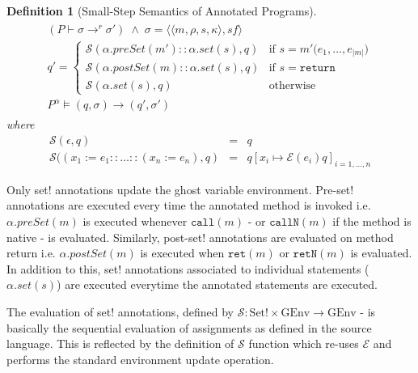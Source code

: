 \documentclass[10pt,notitlepage,twoside]{article}
\newcommand{\eframe}[4]{\langle #1, #2, #3, #4 \rangle}
\newcommand{\state}[2]{\langle #1, #2 \rangle}
\newcommand{\cf}{\mathit{sf}}
\newtheorem{definition}{Definition}
\begin{document}
\begin{definition}[Small-Step Semantics of Annotated Programs]
\begin{displaymath}
\begin{array}{l}
\begin{array}{c}
(P \vdash \sigma \rightarrow^r \sigma')\;\wedge\; \sigma = \state{\eframe{m}{\rho}{s}{\kappa}}{\cf}   \\
q' = \left \{ \begin{array}{ll}
\mathcal{S}(\alpha.\mathit{preSet}(m')::\alpha.\mathit{set}(s),q) & \mbox{if } s = m'\texttt{(}e_1,\ldots,e_{|m|}\texttt{)} \\
\mathcal{S}(\alpha.\mathit{postSet}(m)::\alpha.\mathit{set}(s),q) & \mbox{if } s= \texttt{return}   \\
\mathcal{S}(\alpha.\mathit{set}(s),q) & \mbox{otherwise} 
\end{array} \right . \\
\hline
P^\alpha \models (q,\sigma) \rightarrow (q',\sigma')
\end{array}
\end{array}
\end{displaymath}
where
\begin{displaymath}\begin{array}{rcl}
\mathcal{S}(\epsilon,q) & = & q \\
\mathcal{S}((x_1 := e_1::\ldots::(x_n := e_n),q) & = & q[x_i \mapsto \mathcal{E}(e_i)q]_{i = 1,\ldots,n}
\end{array}
\end{displaymath}
\end{definition}

Only set! annotations update the ghost variable environment. 
Pre-set! annotations are executed every time the annotated method is invoked i.e. $\alpha.\mathit{preSet}(m)$ is executed whenever $\texttt{call}(m)$ - or $\texttt{callN}(m)$ if the method is native -  is evaluated.
Similarly, post-set! annotations are evaluated on method return i.e. $\alpha.\mathit{postSet}(m)$ is executed when $\texttt{ret}(m)$ or $\texttt{retN}(m)$ is evaluated. In addition to this, set! annotations associated to individual statements ($\alpha.\mathit{set}(s)$) are executed everytime the annotated statements are executed.

The evaluation of set! annotations, defined by $\mathcal{S}: \textrm{Set!} \times \textrm{GEnv} \rightarrow \textrm{GEnv}$ - is basically the sequential evaluation of assignments as defined in the source language. This is reflected by the definition of $\mathcal{S}$ function which re-uses $\mathcal{E}$ and performs the standard environment update operation.
\end{document}
